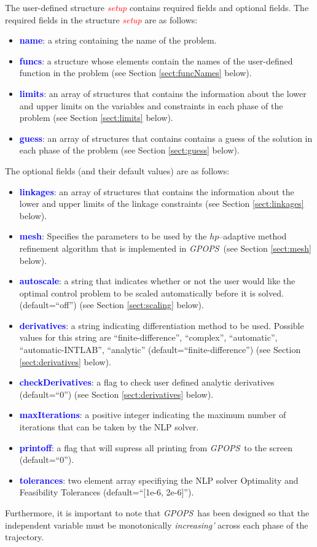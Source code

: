 \documentclass[10pt]{article}
\newcommand{\gpops}{{\em GPOPS}~}
\newcommand{\bfblue}[1]{\textcolor{blue}{\bf #1}}
\newcommand{\slred}[1]{\textcolor{red}{\sl #1}}
\begin{document}
The user-defined structure \slred{setup} contains required fields and
optional fields.  The required fields in the structure \slred{setup}
are as follows:
\begin{itemize}
\item \bfblue{name}:  a string containing the name of the problem.
\item \bfblue{funcs}:  a structure whose elements contain the names
 of the user-defined function in the problem (see Section \ref{sect:funcNames} below).
\item \bfblue{limits}:  an array of structures that contains the
information about the lower and upper limits on the variables and
constraints in each phase of the problem (see Section \ref{sect:limits} below).
\item \bfblue{guess}:  an array of structures that contains
 contains a guess of the solution in each phase of the problem (see Section
 \ref{sect:guess} below).
\end{itemize} 
The optional fields (and their default values) are as follows:
\begin{itemize}
\item \bfblue{linkages}: an array of structures that contains the
 information about the lower and upper limits of the linkage constraints (see Section \ref{sect:linkages} below).
\item \bfblue{mesh}:  Specifies the parameters to be used by the
 $hp$--adaptive method refinement algorithm that is implemented in
 \gpops (see Section \ref{sect:mesh} below).
\item \bfblue{autoscale}: a string that indicates whether or not
 the user would like the optimal control problem to be scaled
 automatically before it is solved. (default=``off'') (see Section \ref{sect:scaling} below).
\item \bfblue{derivatives}:  a string indicating differentiation
  method to be used.  Possible values for this   string are
  ``finite-difference'', ``complex'', ``automatic'',
  ``automatic-INTLAB'', ``analytic'' (default=``finite-difference'')
  (see Section \ref{sect:derivatives} below). 
\item \bfblue{checkDerivatives}:  a flag to check user defined analytic derivatives (default=``0'') (see Section \ref{sect:derivatives} below).
\item \bfblue{maxIterations}:  a positive integer indicating the maximum number of iterations that can be taken by the NLP solver.  
\item \bfblue{printoff}:  a flag that will supress all printing from \gpops to the screen (default=``0'').
\item \bfblue{tolerances}:  two element array specifiying the NLP solver Optimality and Feasibility Tolerances (default=``[1e-6, 2e-6]'').
\end{itemize} 
Furthermore, it is important to note that \gpops has been designed so
that the independent variable must be monotonically {\em increasing'}
across each phase of the trajectory.  
\end{document}
